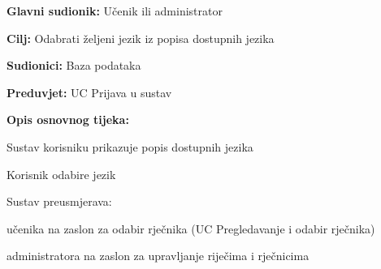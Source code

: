 \noindent {}
\begin{packed_item}

	\item \textbf{Glavni sudionik: } Učenik ili administrator
	\item \textbf{Cilj: } Odabrati željeni jezik iz popisa dostupnih jezika
	\item \textbf{Sudionici: } Baza podataka
	\item \textbf{Preduvjet: } UC Prijava u sustav
	\item  \textbf{Opis osnovnog tijeka:}
	
	\item[] \begin{packed_enum}

		\item Sustav korisniku prikazuje popis dostupnih jezika
		\item Korisnik odabire jezik
		\item Sustav preusmjerava:
		
		\item[] \begin{packed_item}

			\item učenika na zaslon za odabir rječnika (UC Pregledavanje i odabir rječnika)
			\item administratora na zaslon za upravljanje riječima i rječnicima
		
		\end{packed_item}

	\end{packed_enum}
	
\end{packed_item}

